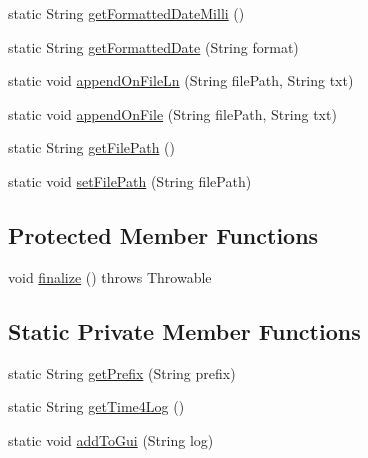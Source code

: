 \begin{DoxyCompactItemize}
static String \hyperlink{classit_1_1emarolab_1_1cagg_1_1debugging_1_1StandaloneDebuggingText_1_1Logger_a60f0465059ecdf007d567e3e91d8ec94}{get\-Formatted\-Date\-Milli} ()
\item 
static String \hyperlink{classit_1_1emarolab_1_1cagg_1_1debugging_1_1StandaloneDebuggingText_1_1Logger_a17c73882baac02ccaedfb3f81e518a55}{get\-Formatted\-Date} (String format)
\item 
static void \hyperlink{classit_1_1emarolab_1_1cagg_1_1debugging_1_1StandaloneDebuggingText_1_1Logger_a424d95a8940d0fbeebb76d9feae0e15f}{append\-On\-File\-Ln} (String file\-Path, String txt)
\item 
static void \hyperlink{classit_1_1emarolab_1_1cagg_1_1debugging_1_1StandaloneDebuggingText_1_1Logger_a7ea2b54b987402310ccc92fb265fb70e}{append\-On\-File} (String file\-Path, String txt)
\item 
static String \hyperlink{classit_1_1emarolab_1_1cagg_1_1debugging_1_1StandaloneDebuggingText_1_1Logger_a6644de1a538f56de688d880ee9dfd7ac}{get\-File\-Path} ()
\item 
static void \hyperlink{classit_1_1emarolab_1_1cagg_1_1debugging_1_1StandaloneDebuggingText_1_1Logger_aec21d826944af3366a045b8aeb071b43}{set\-File\-Path} (String file\-Path)
\end{DoxyCompactItemize}
\subsection*{Protected Member Functions}
\begin{DoxyCompactItemize}
\item 
void \hyperlink{classit_1_1emarolab_1_1cagg_1_1debugging_1_1StandaloneDebuggingText_1_1Logger_a893b372cc406f19101d57fe50d09f59b}{finalize} ()  throws Throwable 
\end{DoxyCompactItemize}
\subsection*{Static Private Member Functions}
\begin{DoxyCompactItemize}
\item 
static String \hyperlink{classit_1_1emarolab_1_1cagg_1_1debugging_1_1StandaloneDebuggingText_1_1Logger_aa9fd000c5dd5f84d5b3b532e711cf514}{get\-Prefix} (String prefix)
\item 
static String \hyperlink{classit_1_1emarolab_1_1cagg_1_1debugging_1_1StandaloneDebuggingText_1_1Logger_ac002e424bd3b0430ae8a11b619a597aa}{get\-Time4\-Log} ()
\item 
static void \hyperlink{classit_1_1emarolab_1_1cagg_1_1debugging_1_1StandaloneDebuggingText_1_1Logger_aa186fc799ce00b7edd19ac90b16b05d3}{add\-To\-Gui} (String log)
\end{DoxyCompactItemize}
